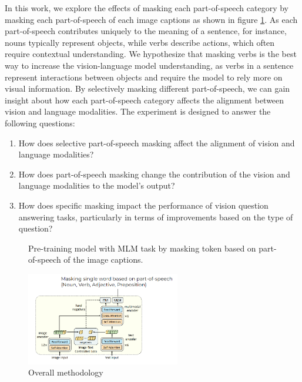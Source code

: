 In this work, we explore the effects of masking each part-of-speech category by masking each part-of-speech of each image captions as shown in figure \ref{fig:overview}. 
As each part-of-speech contributes uniquely to the meaning of a sentence, for instance, nouns typically represent objects, while verbs describe actions, which often require contextual understanding. 
We hypothesize that masking verbs is the best way to increase the vision-language model understanding, as verbs in a sentence represent interactions between objects and require the model to rely more on visual information.
By selectively masking different part-of-speech, we can gain insight about how each part-of-speech category affects the alignment between vision and language modalities. 
The experiment is designed to answer the following questions:
\begin{enumerate}
    \item How does selective part-of-speech masking affect the alignment of vision and language modalities?
    \item How does part-of-speech masking change the contribution of the vision and language modalities to the model's output?
    \item How does specific masking impact the performance of vision question answering tasks, particularly in terms of improvements based on the type of question?
\end{enumerate}

\begin{figure}[h]
    \caption{Overall methodology}
    \label{fig:overview}
    Pre-training model with MLM task by masking token based on part-of-speech of the image captions.
    \begin{center}
        \includegraphics[width=0.6\textwidth]{Images/overview.png}
    \end{center}
    \small
\end{figure}

